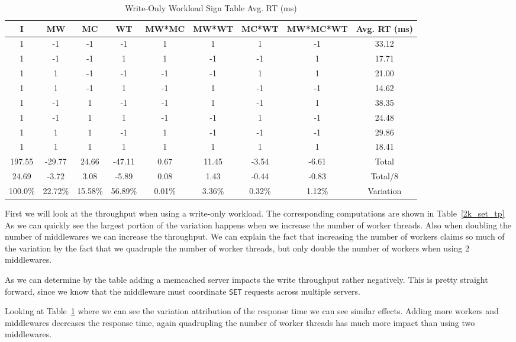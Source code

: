\documentclass[11pt,a4paper]{article}
\begin{document}
%
\begin{table}[H]
\centering
\scriptsize{
\begin{tabular}{|c|ccccccc|c|}
\hline I & MW & MC & WT & MW*MC & MW*WT & MC*WT & MW*MC*WT & Avg. RT (ms)\\
\hline
1 & -1 & -1 & -1 & 1 & 1 & 1 & -1 & 33.12\\
1 & -1 & -1 & 1 & 1 & -1 & -1 & 1 & 17.71\\
1 & 1 & -1 & -1 & -1 & -1 & 1 & 1 & 21.00\\
1 & 1 & -1 & 1 & -1 & 1 & -1 & -1 & 14.62\\
1 & -1 & 1 & -1 & -1 & 1 & -1 & 1 & 38.35\\
1 & -1 & 1 & 1 & -1 & -1 & 1 & -1 & 24.48\\
1 & 1 & 1 & -1 & 1 & -1 & -1 & -1 & 29.86\\
1 & 1 & 1 & 1 & 1 & 1 & 1 & 1 & 18.41\\
\hline
197.55 & -29.77 & 24.66 & -47.11 & 0.67 & 11.45 & -3.54 & -6.61 & Total\\
24.69 & -3.72 & 3.08 & -5.89 & 0.08 & 1.43 & -0.44 & -0.83 & Total/8\\
100.0\% & 22.72\% & 15.58\% & 56.89\% & 0.01\% & 3.36\% & 0.32\% & 1.12\% & Variation\\
\hline
\end{tabular}
}
\caption{Write-Only Workload Sign Table Avg. RT (ms)}
\label{2k_set_rt}
\end{table}
%
First we will look at the throughput when using a write-only workload.
%
The corresponding computations are shown in Table~\ref{2k_set_tp}
%
As we can quickly see the largest portion of the variation happens when we increase the number of worker threads.
%
Also when doubling the number of middlewares we can increase the throughput.
%
We can explain the fact that increasing the number of workers claims so much of the variation by the fact that we quadruple the number of worker threads, but only double the number of workers when using 2 middlewares.
%
\par
%
As we can determine by the table adding a memcached server impacts the write throughput rather negatively.
%
This is pretty straight forward, since we know that the middleware must coordinate \texttt{SET} requests across multiple servers.
%
\par
%
Looking at Table~\ref{2k_set_rt} where we can see the variation attribution of the response time we can see similar effects.
%
Adding more workers and middlewares decreases the response time, again quadrupling the number of worker threads has much more impact than using two middlewares.
\end{document}
